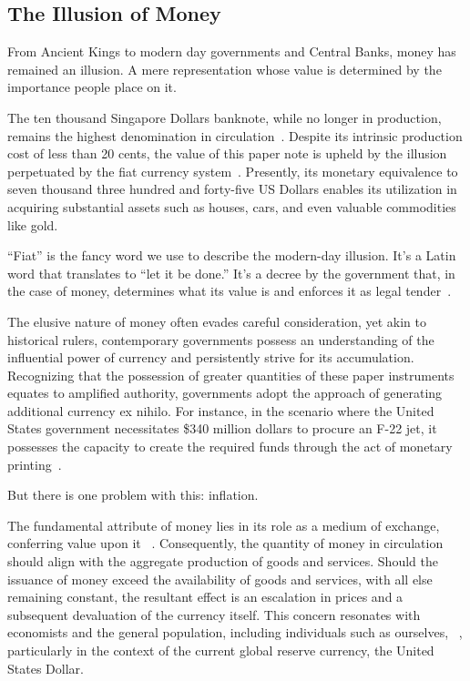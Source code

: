\subsection{The Illusion of Money}
From Ancient Kings to modern day governments and Central Banks, money has remained an illusion. A mere representation whose value is determined
by the importance people place on it.

The ten thousand Singapore Dollars banknote, while no longer in production, remains the highest denomination in circulation~\cite{goodhart1998}.
Despite its intrinsic production cost of less than 20 cents, the value of this paper note is upheld by the illusion perpetuated by the fiat
currency system~\cite{gupta2019}. Presently, its monetary equivalence to seven thousand three hundred and forty-five US Dollars enables its
utilization in acquiring substantial assets such as houses, cars, and even valuable commodities like gold.

“Fiat” is the fancy word we use to describe the modern-day illusion. It's a Latin word that translates to “let it be done.” It's a decree by
the government that, in the case of money, determines what its value is and enforces it as legal tender~\cite{reinhart2018, friedman2000}.

The elusive nature of money often evades careful consideration, yet akin to historical rulers, contemporary governments possess an understanding
of the influential power of currency and persistently strive for its accumulation. Recognizing that the possession of greater quantities of these
paper instruments equates to amplified authority, governments adopt the approach of generating additional currency ex nihilo. For instance, in the
scenario where the United States government necessitates \$340 million dollars to procure an F-22 jet, it possesses the capacity to create the
required funds through the act of monetary printing~\cite{graeber2011, mankiw2014}.

But there is one problem with this: inflation.

The fundamental attribute of money lies in its role as a medium of exchange, conferring value upon it ~\cite{mankiw2014}. Consequently, the
quantity of money in circulation should align with the aggregate production of goods and services. Should the issuance of money exceed the
availability of goods and services, with all else remaining constant, the resultant effect is an escalation in prices and a subsequent
devaluation of the currency itself. This concern resonates with economists and the general population, including individuals such as ourselves,
~\cite{blinder2010}, particularly in the context of the current global reserve currency, the United States Dollar.

